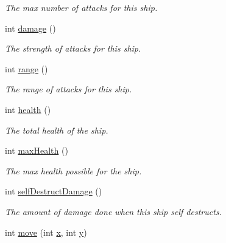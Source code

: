 \begin{DoxyCompactItemize}
\begin{DoxyCompactList}\small\item\em \-The max number of attacks for this ship. \end{DoxyCompactList}\item 
\hypertarget{classShip_a2f5a645d5d8e08742ca0653c589283da}{int \hyperlink{classShip_a2f5a645d5d8e08742ca0653c589283da}{damage} ()}\label{classShip_a2f5a645d5d8e08742ca0653c589283da}

\begin{DoxyCompactList}\small\item\em \-The strength of attacks for this ship. \end{DoxyCompactList}\item 
\hypertarget{classShip_a3c86414bae08c315915cccd3a226dee1}{int \hyperlink{classShip_a3c86414bae08c315915cccd3a226dee1}{range} ()}\label{classShip_a3c86414bae08c315915cccd3a226dee1}

\begin{DoxyCompactList}\small\item\em \-The range of attacks for this ship. \end{DoxyCompactList}\item 
\hypertarget{classShip_a54cbdca10d56b9c8b434e862bf9a4db2}{int \hyperlink{classShip_a54cbdca10d56b9c8b434e862bf9a4db2}{health} ()}\label{classShip_a54cbdca10d56b9c8b434e862bf9a4db2}

\begin{DoxyCompactList}\small\item\em \-The total health of the ship. \end{DoxyCompactList}\item 
\hypertarget{classShip_a5332f3cca69c3b8f46dc54e785548073}{int \hyperlink{classShip_a5332f3cca69c3b8f46dc54e785548073}{max\-Health} ()}\label{classShip_a5332f3cca69c3b8f46dc54e785548073}

\begin{DoxyCompactList}\small\item\em \-The max health possible for the ship. \end{DoxyCompactList}\item 
\hypertarget{classShip_a68399e9ba8ed807b3a1c8cdef1e3248b}{int \hyperlink{classShip_a68399e9ba8ed807b3a1c8cdef1e3248b}{self\-Destruct\-Damage} ()}\label{classShip_a68399e9ba8ed807b3a1c8cdef1e3248b}

\begin{DoxyCompactList}\small\item\em \-The amount of damage done when this ship self destructs. \end{DoxyCompactList}\item 
\hypertarget{classShip_a049e7b355e7901aa60b959d1f3ba0487}{int \hyperlink{classShip_a049e7b355e7901aa60b959d1f3ba0487}{move} (int \hyperlink{classShip_a77ddb81c9f217deb27ffb27a5681da18}{x}, int \hyperlink{classShip_a1c40c66fb72bb07916e16f156605fcfe}{y})}\label{classShip_a049e7b355e7901aa60b959d1f3ba0487}


\end{DoxyCompactItemize}
